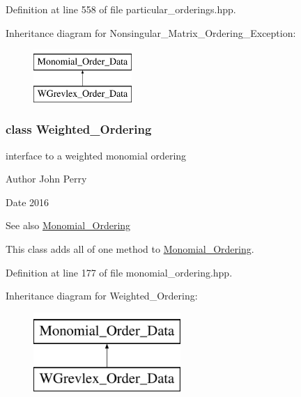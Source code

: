 Definition at line 558 of file particular\+\_\+orderings.\+hpp.

Inheritance diagram for Nonsingular\+\_\+\+Matrix\+\_\+\+Ordering\+\_\+\+Exception\+:\begin{figure}[H]
\begin{center}
\leavevmode
\includegraphics[height=2.000000cm]{group__orderinggroup}
\end{center}
\end{figure}
\label{class_weighted___ordering}
\subsubsection{class Weighted\+\_\+\+Ordering}
interface to a weighted monomial ordering 

\begin{DoxyAuthor}{Author}
John Perry 
\end{DoxyAuthor}
\begin{DoxyDate}{Date}
2016 
\end{DoxyDate}
\begin{DoxySeeAlso}{See also}
\hyperlink{group__orderinggroup_class_monomial___ordering}{Monomial\+\_\+\+Ordering}
\end{DoxySeeAlso}
This class adds all of one method to \hyperlink{group__orderinggroup_class_monomial___ordering}{Monomial\+\_\+\+Ordering}. 

Definition at line 177 of file monomial\+\_\+ordering.\+hpp.

Inheritance diagram for Weighted\+\_\+\+Ordering\+:\begin{figure}[H]
\begin{center}
\leavevmode
\includegraphics[height=3.000000cm]{group__orderinggroup}
\end{center}
\end{figure}
